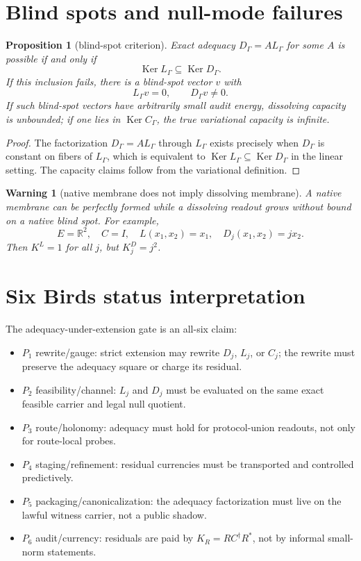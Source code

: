 \documentclass[11pt]{article}
\newtheorem{proposition}[theorem]{Proposition}
\newtheorem{warning}[theorem]{Warning}
\newcommand{\Ker}{\operatorname{Ker}}
\begin{document}
\section{Blind spots and null-mode failures}

\begin{proposition}[blind-spot criterion]
Exact adequacy $D_{\Gamma}=AL_{\Gamma}$ for some $A$ is possible if and only if
\[
  \Ker L_{\Gamma}\subseteq \Ker D_{\Gamma}.
\]
If this inclusion fails, there is a blind-spot vector $v$ with
\[
  L_{\Gamma}v=0,
  \qquad
  D_{\Gamma}v\ne0.
\]
If such blind-spot vectors have arbitrarily small audit energy, dissolving capacity is unbounded; if one lies in $\Ker C_{\Gamma}$, the true variational capacity is infinite.
\end{proposition}

\begin{proof}
The factorization $D_{\Gamma}=AL_{\Gamma}$ through $L_{\Gamma}$ exists precisely when $D_{\Gamma}$ is constant on fibers of $L_{\Gamma}$, which is equivalent to $\Ker L_{\Gamma}\subseteq\Ker D_{\Gamma}$ in the linear setting. The capacity claims follow from the variational definition.
\end{proof}

\begin{warning}[native membrane does not imply dissolving membrane]
A native membrane can be perfectly formed while a dissolving readout grows without bound on a native blind spot. For example,
\[
  E=\mathbb R^2,
  \quad
  C=I,
  \quad
  L(x_1,x_2)=x_1,
  \quad
  D_j(x_1,x_2)=j x_2.
\]
Then $K^L=1$ for all $j$, but $K^D_j=j^2$.
\end{warning}

\section{Six Birds status interpretation}

The adequacy-under-extension gate is an all-six claim:
\begin{itemize}[leftmargin=1.5em]
\item $P_1$ rewrite/gauge: strict extension may rewrite $D_j$, $L_j$, or $C_j$; the rewrite must preserve the adequacy square or charge its residual.
\item $P_2$ feasibility/channel: $L_j$ and $D_j$ must be evaluated on the same exact feasible carrier and legal null quotient.
\item $P_3$ route/holonomy: adequacy must hold for protocol-union readouts, not only for route-local probes.
\item $P_4$ staging/refinement: residual currencies must be transported and controlled predictively.
\item $P_5$ packaging/canonicalization: the adequacy factorization must live on the lawful witness carrier, not a public shadow.
\item $P_6$ audit/currency: residuals are paid by $K_R=RC^\dagger R^*$, not by informal small-norm statements.
\end{itemize}
\end{document}
